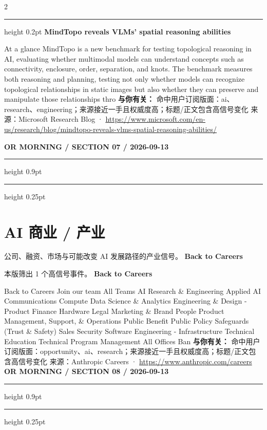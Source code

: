 \documentclass[10.5pt]{ctexart}
\begin{document}
\begin{multicols}{2}
\vspace{2mm}
\hrule height 0.2pt
\vspace{2mm}
{\large\bfseries MindTopo reveals VLMs’ spatial reasoning abilities}\par
At a glance MindTopo is a new benchmark for testing topological reasoning in AI, evaluating whether multimodal models can understand concepts such as connectivity, enclosure, order, separation, and knots. The benchmark measures both reasoning and planning, testing not only whether models can recognize topological relationships in static images but also whether they can preserve and manipulate those relationships thro
\textbf{与你有关：} 命中用户订阅版面：ai、research、engineering；来源接近一手且权威度高；标题/正文包含高信号变化
{\footnotesize\color{ormuted} 来源：Microsoft Research Blog · \url{https://www.microsoft.com/en-us/research/blog/mindtopo-reveals-vlms-spatial-reasoning-abilities/}}
\end{multicols}
\newpage
{\small\bfseries OR MORNING / SECTION 07 / 2026-09-13}
\vspace{2mm}
\hrule height 0.9pt
\vspace{1.5mm}
\hrule height 0.25pt
\vspace{4mm}
\section*{AI 商业 / 产业}
{\color{ormuted} 公司、融资、市场与可能改变 AI 发展路径的产业信号。}
\vspace{2mm}
{\LARGE\bfseries Back to Careers}\par
\vspace{1mm}
{\color{ormuted} 本版筛出 1 个高信号事件。}
\vspace{3mm}
{\Large\bfseries Back to Careers}\par
Back to Careers Join our team All Teams AI Research \& Engineering Applied AI Communications Compute Data Science \& Analytics Engineering \& Design - Product Finance Hardware Legal Marketing \& Brand People Product Management, Support, \& Operations Public Benefit Public Policy Safeguards (Trust \& Safety) Sales Security Software Engineering - Infrastructure Technical Education Technical Program Management All Offices Ban
\textbf{与你有关：} 命中用户订阅版面：opportunity、ai、research；来源接近一手且权威度高；标题/正文包含高信号变化
{\footnotesize\color{ormuted} 来源：Anthropic Careers · \url{https://www.anthropic.com/careers}}
\newpage
{\small\bfseries OR MORNING / SECTION 08 / 2026-09-13}
\vspace{2mm}
\hrule height 0.9pt
\vspace{1.5mm}
\hrule height 0.25pt
\vspace{4mm}
\end{document}
